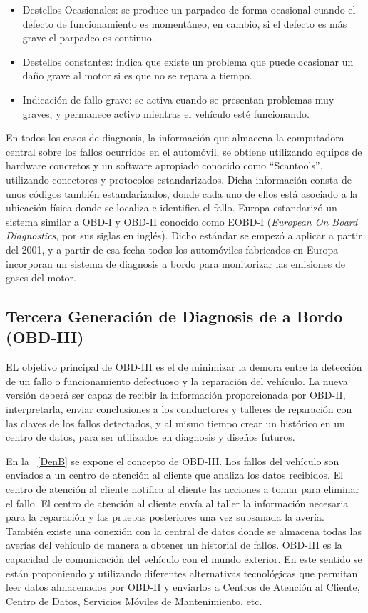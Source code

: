 \begin{itemize}
    \item Destellos Ocasionales: se produce un parpadeo de forma ocasional cuando el defecto de funcionamiento es momentáneo, en cambio, si el defecto es más grave el parpadeo es continuo.
    \item Destellos constantes: indica que existe un problema que puede ocasionar un daño grave al motor si es que no se repara a tiempo. 
    \item Indicación de fallo grave: se activa cuando se presentan problemas muy graves, y permanece activo mientras el vehículo esté funcionando.
\end{itemize}

En todos los casos de diagnosis, la información que almacena la computadora central sobre los fallos ocurridos en el automóvil, se obtiene utilizando equipos de hardware concretos y un software apropiado conocido como “Scantools”, utilizando conectores y protocolos estandarizados.
Dicha información consta de unos códigos también estandarizados, donde cada uno de ellos está asociado a la ubicación física donde se localiza e identifica el fallo.
Europa estandarizó un sistema similar a OBD-I y OBD-II conocido como EOBD-I (\textit{European On Board Diagnostics}, por sus siglas en inglés).
Dicho estándar se empezó a aplicar a partir del 2001, y a partir de esa fecha todos los automóviles fabricados en Europa incorporan un sistema de diagnosis a bordo para monitorizar las emisiones de gases del motor.

\subsection {Tercera Generación de Diagnosis de a Bordo (OBD-III)}


EL objetivo principal de OBD-III es el de minimizar la demora entre la detección de un fallo o funcionamiento defectuoso y la reparación del vehículo. 
La nueva versión deberá ser capaz de recibir la información proporcionada por OBD-II, interpretarla, enviar conclusiones a los conductores y talleres de reparación con las claves de los fallos detectados, y al mismo tiempo crear un histórico en un centro de datos, para ser utilizados en diagnosis y diseños futuros.


En la  \Figura~\ref{DenB} se expone el concepto de OBD-III. 
Los fallos del vehículo son enviados  a un centro de atención al cliente que analiza los datos recibidos. 
El centro de atención al cliente notifica al cliente las acciones a tomar para eliminar el fallo. 
El centro de atención al cliente envía al taller la información necesaria para la reparación  y las pruebas posteriores una vez subsanada la avería. 
También existe una conexión con la central de datos donde se almacena todas las averías del vehículo de manera a obtener un historial de fallos.
OBD-III es la capacidad de comunicación del vehículo con el mundo exterior. 
En este sentido se están proponiendo y utilizando diferentes alternativas tecnológicas que permitan leer datos almacenados por OBD-II y enviarlos a Centros de Atención al Cliente, Centro de Datos, Servicios Móviles de Mantenimiento, etc.

